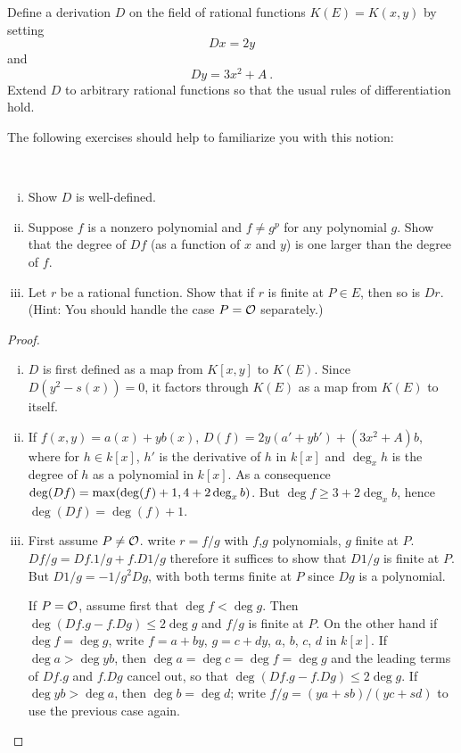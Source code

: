 \begin{defi}
\label{d8.1}
Define a derivation $D$ on the field of rational functions $K(E)= K(x, y)$ by setting
$$
Dx=2y
$$
and
$$
Dy=3x^{2}+A\ .
$$
Extend $D$ to arbitrary rational functions so that the usual rules of differentiation hold.
\end{defi}

The following exercises should help to familiarize you with this notion:

\begin{exo}
\label{e8.2}
~
\begin{enumerate}[(i)]
\item
Show $D$ is well-defined.
\item
Suppose $f$ is a nonzero polynomial and $f\neq g^{p}$ for any polynomial $g$. Show that the degree of $Df$ (as a function of $x$ and $y$) is one larger than the degree of $f$.
\item
Let $r$ be a rational function. Show that if $r$ is finite at $P\in E$, then so is $Dr$. (Hint: You should handle the case $P=\mathcal{O}$ separately.)
\end{enumerate}
\end{exo}

\begin{proof}
~
\begin{enumerate}[(i)]
\item
$D$ is first defined as a map from $K[x,y]$ to $K(E)$. Since $D(y^2-s(x))=0$, it factors through $K(E)$ as a map from $K(E)$ to itself.
\item
If $f(x,y) = a(x) + y b(x)$, $D(f) = 2y (a' + y b') + (3x^2+A)  b$, where for $h \in k[x]$, $h'$ is the derivative of $h$ in $k[x]$ and $\deg_x h$ is the degree of $h$ as a polynomial in $k[x]$. As a consequence $\deg(Df) = \operatorname{max}(\deg(f) + 1, 4 + 2 \deg_x b)$. But $\deg f \geq 3 + 2 \deg_x b$, hence $\deg(Df) = \deg(f) + 1$.
\item
First assume $P \neq \mathcal{O}$. write $r = f/g$ with $f$,$g$ polynomials, $g$ finite at $P$. $Df/g= Df. 1/g + f. D1/g$ therefore it suffices to show that $D1/g$ is finite at $P$. But $D1/g= -1/g^2 Dg$, with both terms finite at $P$ since $Dg$ is a polynomial.

If $P=\mathcal{O}$, assume first that $\deg f < \deg g$. Then $\deg(Df . g - f . Dg) \leq 2 \deg g$ and $f/g$ is finite at $P$. On the other hand if $\deg f = \deg g$, write $f = a +b y$, $g=c+dy$, $a$, $b$, $c$, $d$ in $k[x]$. If $\deg a > \deg y b$, then $\deg a =\deg c = \deg f = \deg g$ and the leading terms of $Df . g$ and $f. Dg$ cancel out, so that $\deg(Df . g - f . Dg) \leq 2 \deg g$. If $\deg y b > \deg a$, then $\deg b = \deg d$; write $f/g=(ya+sb)/(yc+sd)$ to use the previous case again. 
\end{enumerate}
\end{proof}


